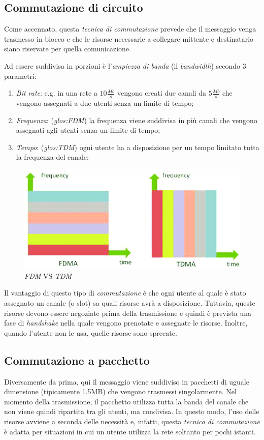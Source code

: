 \subsection{Commutazione di circuito}
Come accennato, questa \emph{tecnica di commutazione} prevede che il messaggio
venga trasmesso in blocco e che le risorse necessarie a collegare mittente e
destinatario siano riservate per quella comunicazione.

Ad essere suddivisa in porzioni è l'\emph{ampiezza di banda} (il \emph{bandwidth})
secondo 3 parametri:
\begin{enumerate}
    \item \emph{Bit rate}: e.g. in una rete a $10\frac{Mb}{s}$ vengono creati due
    canali da $5\frac{Mb}{s}$ che vengono assegnati a due utenti senza un limite
    di tempo;
    \item \emph{Frequenza}: (\emph{\gls{glos:FDM}}) la frequenza
    viene suddivisa in più canali che vengono assegnati agli utenti senza un limite
    di tempo;
    \item \emph{Tempo}: (\emph{\gls{glos:TDM}}) ogni utente ha a
    disposizione per un tempo limitato tutta la frequenza del canale;
\end{enumerate}

\begin{figure}[h]
    \centering
    \includegraphics[width=\textwidth]{images/fdm-tdm.png}
    \caption{\emph{FDM} VS \emph{TDM}}
\end{figure}\noindent
Il vantaggio di questo tipo di \emph{commutazione} è che ogni utente al quale è
stato assegnato un canale (o slot) sa quali risorse avrà a disposizione. Tuttavia,
queste risorse devono essere negoziate prima della trasmissione e quindi è prevista
una fase di \emph{handshake} nella quale vengono prenotate e assegnate le risorse.
Inoltre, quando l'utente non le usa, quelle risorse sono sprecate.

\subsection{Commutazione a pacchetto}
Diversamente da prima, qui il messaggio viene suddiviso in pacchetti di uguale
dimensione (tipicamente 1.5MB) che vengono trasmessi singolarmente. Nel momento
della trasmissione, il pacchetto utilizza tutta la banda del canale che non viene
quindi ripartita tra gli utenti, ma condivisa. In questo modo, l'uso delle
risorse avviene a seconda delle necessità e, infatti, questa \emph{tecnica di
commutazione} è adatta per situazioni in cui un utente utilizza la rete soltanto
per pochi istanti.

